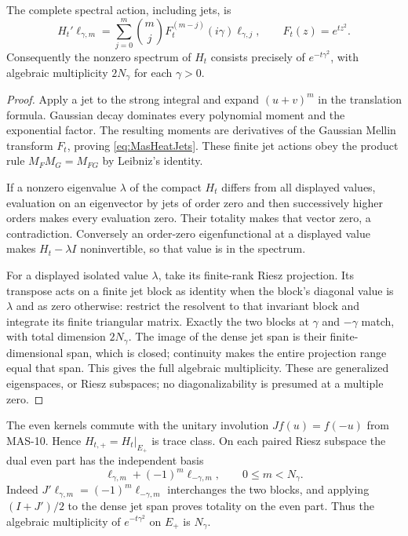 \documentclass[11pt,a4paper]{article}
\newcommand{\fid}[1]{\textsf{#1}}
\begin{document}
The complete spectral action, including jets, is
\begin{equation}\label{eq:MasHeatJets}
 H_t'\ell_{\gamma,m}
 =\sum_{j=0}^m\binom mj
 F_t^{(m-j)}(i\gamma)\ell_{\gamma,j},
 \qquad F_t(z)=e^{tz^2}.
\end{equation}
Consequently the nonzero spectrum of $H_t$ consists precisely of $e^{-t\gamma^2}$, with algebraic multiplicity $2N_\gamma$ for each $\gamma>0$.
\begin{proof}
Apply a jet to the strong integral and expand $(u+v)^m$ in the translation formula. Gaussian decay dominates every polynomial moment and the exponential factor. The resulting moments are derivatives of the Gaussian Mellin transform $F_t$, proving \eqref{eq:MasHeatJets}. These finite jet actions obey the product rule $M_FM_G=M_{FG}$ by Leibniz's identity.

If a nonzero eigenvalue $\lambda$ of the compact $H_t$ differs from all displayed values, evaluation on an eigenvector by jets of order zero and then successively higher orders makes every evaluation zero. Their totality makes that vector zero, a contradiction. Conversely an order-zero eigenfunctional at a displayed value makes $H_t-\lambda I$ noninvertible, so that value is in the spectrum.

For a displayed isolated value $\lambda$, take its finite-rank Riesz projection. Its transpose acts on a finite jet block as identity when the block's diagonal value is $\lambda$ and as zero otherwise: restrict the resolvent to that invariant block and integrate its finite triangular matrix. Exactly the two blocks at $\gamma$ and $-\gamma$ match, with total dimension $2N_\gamma$. The image of the dense jet span is their finite-dimensional span, which is closed; continuity makes the entire projection range equal that span. This gives the full algebraic multiplicity. These are generalized eigenspaces, or Riesz subspaces; no diagonalizability is presumed at a multiple zero.
\end{proof}

The even kernels commute with the unitary involution $Jf(u)=f(-u)$ from \fid{MAS-10}. Hence $H_{t,+}=H_t|_{E_+}$ is trace class. On each paired Riesz subspace the dual even part has the independent basis
\[
 \ell_{\gamma,m}+(-1)^m\ell_{-\gamma,m},
 \qquad 0\le m<N_\gamma.
\]
Indeed $J'\ell_{\gamma,m}=(-1)^m\ell_{-\gamma,m}$ interchanges the two blocks, and applying $(I+J')/2$ to the dense jet span proves totality on the even part. Thus the algebraic multiplicity of $e^{-t\gamma^2}$ on $E_+$ is $N_\gamma$.
\end{document}
